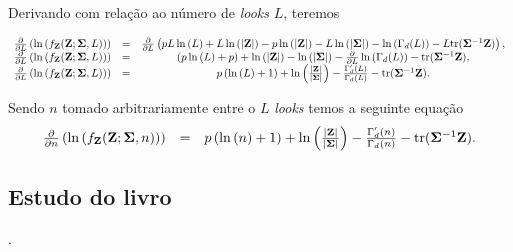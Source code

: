 \documentclass[10pt,a4paper]{article}
\begin{document}
Derivando com relação ao número de {\it looks} $L$, teremos

\begin{equation}\label{sec71eqn3}
\begin{array}{ccc}
	\frac{\partial}{\partial L}\left(\ln{\left(f_{{\bf Z}}({\bf Z};{\bf \Sigma},L)\right)}\right)&=&\frac{\partial}{\partial L}\left(pL\ln{\left(L\right)}+L\ln{\left( |{\bf Z}|\right)}-p\ln{\left( |{\bf Z}|\right)} - L \ln{\left(|{\bf \Sigma}|\right)}-\ln{\left(\Gamma_d(L)\right)}-L\mathrm{tr}{({\bf \Sigma}^{-1}{\bf Z})}\right), \\
	\frac{\partial}{\partial L}\left(\ln{\left(f_{{\bf Z}}({\bf Z};{\bf \Sigma},L)\right)}\right)&=&\left(p\ln{\left(L\right)}+p\right)+\ln{\left( |{\bf Z}|\right)} - \ln{\left(|{\bf \Sigma}|\right)}-\frac{\partial}{\partial L}\ln{\left(\Gamma_d(L)\right)}-\mathrm{tr}{({\bf \Sigma}^{-1}{\bf Z})}, \\
	\frac{\partial}{\partial L}\left(\ln{\left(f_{{\bf Z}}({\bf Z};{\bf \Sigma},L)\right)}\right)&=&p\left(\ln{\left(L\right)}+1\right)+\ln{\left(\frac{|{\bf Z}|}{|\bf \Sigma|}\right)}-\frac{\Gamma^{\prime}_d(L)}{\Gamma_d(L)}-\mathrm{tr}{({\bf \Sigma}^{-1}{\bf Z})}. \\
\end{array}
\end{equation}

Sendo $n$ tomado arbitrariamente entre o $L$ {\it looks} temos a seguinte equação
\begin{equation}\label{sec71eqn4}
\begin{array}{ccc}
	\frac{\partial}{\partial n}\left(\ln{\left(f_{{\bf Z}}({\bf Z};{\bf \Sigma},n)\right)}\right)&=&p\left(\ln{\left(n\right)}+1\right)+\ln{\left(\frac{|{\bf Z}|}{|\bf \Sigma|}\right)}-\frac{\Gamma^{\prime}_d(n)}{\Gamma_d(n)}-\mathrm{tr}{({\bf \Sigma}^{-1}{\bf Z})}. \\
\end{array}
\end{equation}



\subsection{Estudo do livro  \cite{lee2009polarimetric}}.
\end{document}
